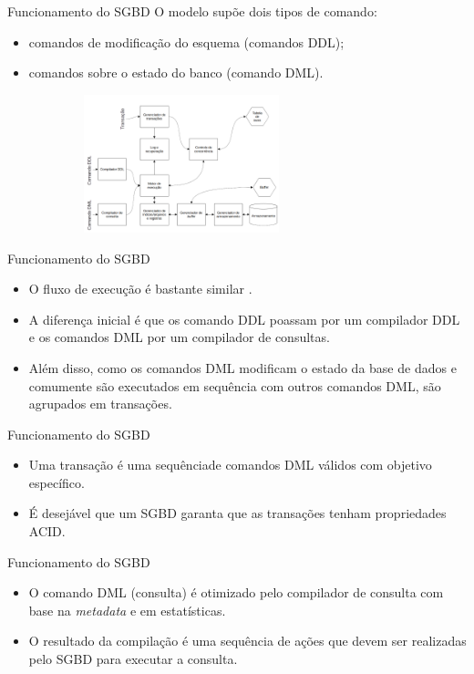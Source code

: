 \documentclass[11pt]{beamer}
\begin{document}
\begin{frame}{Funcionamento do SGBD}
    O modelo supõe dois tipos de comando:
    \begin{itemize}
        \item comandos de modificação do esquema (comandos DDL);
        \item comandos sobre o estado do banco (comando DML).
    \end{itemize}
    \begin{figure}
        \includegraphics[width=8cm, height=4cm]{figures/database_overview.png}
    \end{figure}
\end{frame}

\begin{frame}{Funcionamento do SGBD}
    \begin{itemize}
        \item O fluxo de execução é bastante similar .
        \item A diferença inicial é que os comando DDL poassam por um compilador DDL e os comandos DML por um compilador de consultas.
        \item Além disso, como os comandos DML modificam o estado da base de dados e comumente são executados em sequência com outros comandos DML, são agrupados em transações.
    \end{itemize}
\end{frame}

\begin{frame}{Funcionamento do SGBD}
    \begin{itemize}
        \item Uma transação é uma sequênciade comandos DML válidos com objetivo específico.
        \item É desejável que um SGBD garanta que as transações tenham propriedades ACID.
    \end{itemize}
\end{frame}

\begin{frame}{Funcionamento do SGBD}
    \begin{itemize}
        \item O comando DML (consulta) é otimizado pelo compilador de consulta com base na \textit{metadata} e em estatísticas.
        \item O resultado da compilação é uma sequência de ações que devem ser realizadas pelo SGBD para executar a consulta.
    \end{itemize}
\end{frame}
\end{document}
